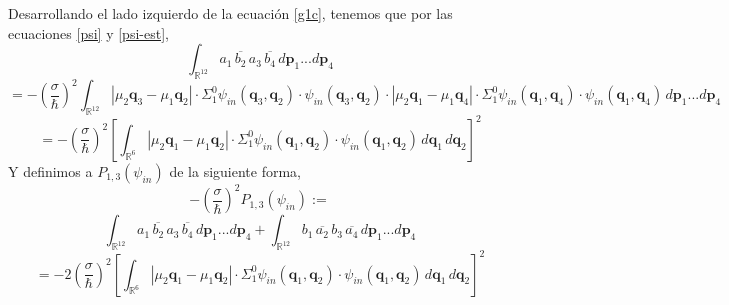 \documentclass[12pt]{book}
\numberwithin{equation}{chapter}
\def\q{\mathbf{q}}
\def\R{\mathbb{R}}
\def\P{\mathbf{p}}
\begin{document}
\vspace{3 mm}

Desarrollando el lado izquierdo de la ecuaci\'on \eqref{g1c}, tenemos que por las ecuaciones \eqref{psi} y \eqref{psi-est},
$$\int_{\R^{12}} a_{1}\,\overline{b_{2}}\,a_{3}\,\overline{b_{4}} \,d\P_{1}...d\P_{4} $$
$$= - \left(\frac{\sigma}{\hbar} \right)^{2} \int_{\R^{12}} |\mu_{2} \q_{3}-\mu_{1}\q_{2}| \cdot \Sigma_{1}^{0} \psi_{in}(\q_{3},\q_{2}) \cdot \psi_{in}(\q_{3},\q_{2}) \cdot |\mu_{2} \q_{1}-\mu_{1}\q_{4}| \cdot \Sigma_{1}^{0} \psi_{in}(\q_{1},\q_{4}) \cdot \psi_{in}(\q_{1},\q_{4})\,d\P_{1}...d\P_{4} $$
$$= - \left(\frac{\sigma}{\hbar} \right)^{2} \left[ \int_{\R^{6}} |\mu_{2} \q_{1}-\mu_{1}\q_{2}| \cdot \Sigma_{1}^{0} \psi_{in}(\q_{1},\q_{2}) \cdot \psi_{in}(\q_{1},\q_{2}) \, d\q_{1}\,d\q_{2}  \right]^{2} $$
Y definimos a $P_{1,3}(\psi_{in})$ de la siguiente forma,
$$- \left(\frac{\sigma}{\hbar} \right)^{2} P_{1,3}(\psi_{in}) :=$$
$$\int_{\R^{12}} a_{1}\, \overline{b_{2}} \, a_{3} \, \overline{b_{4}} \,d\P_{1}...d\P_{4} + \int_{\R^{12}} b_{1}\, \overline{a_{2}} \, b_{3}\, \overline{a_{4}} \,d\P_{1}...d\P_{4} $$
\begin{equation}\label{p1_3}
=-2 \left(\frac{\sigma}{\hbar} \right)^{2} \left[ \int_{\R^{6}} |\mu_{2} \q_{1}-\mu_{1}\q_{2}| \cdot \Sigma_{1}^{0} \psi_{in}(\q_{1},\q_{2}) \cdot \psi_{in}(\q_{1},\q_{2}) \, d\q_{1}\,d\q_{2}  \right]^{2}
\end{equation}
\end{document}

